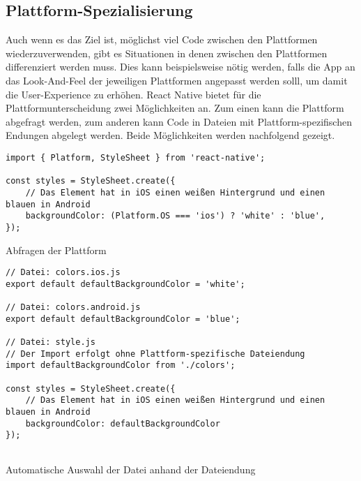 \subsection{Plattform-Spezialisierung}
Auch wenn es das Ziel ist, möglichst viel Code zwischen den Plattformen wiederzuverwenden, gibt es Situationen in denen zwischen den Plattformen differenziert werden muss. Dies kann beispielsweise nötig werden, falls die App an das Look-And-Feel der jeweiligen Plattformen angepasst werden solll, um damit die User-Experience zu erhöhen.
React Native bietet für die Plattformunterscheidung zwei Möglichkeiten an. Zum einen kann die Plattform abgefragt werden, zum anderen kann Code in Dateien mit Plattform-spezifischen Endungen abgelegt werden. Beide Möglichkeiten werden nachfolgend gezeigt.

\begin{listing}[H]
    \begin{verbatim}
import { Platform, StyleSheet } from 'react-native';

const styles = StyleSheet.create({
    // Das Element hat in iOS einen weißen Hintergrund und einen blauen in Android
    backgroundColor: (Platform.OS === 'ios') ? 'white' : 'blue',
});
    \end{verbatim}
    \caption{Abfragen der Plattform}
    \label{lst:platform_os}
\end{listing}

\begin{listing}[H]
    \begin{verbatim}
// Datei: colors.ios.js
export default defaultBackgroundColor = 'white';

// Datei: colors.android.js
export default defaultBackgroundColor = 'blue';
 
// Datei: style.js
// Der Import erfolgt ohne Plattform-spezifische Dateiendung
import defaultBackgroundColor from './colors';
 
const styles = StyleSheet.create({
    // Das Element hat in iOS einen weißen Hintergrund und einen blauen in Android
    backgroundColor: defaultBackgroundColor
});
     
    \end{verbatim}
    \caption{Automatische Auswahl der Datei anhand der Dateiendung}
    \label{lst:platform_file}
\end{listing}

